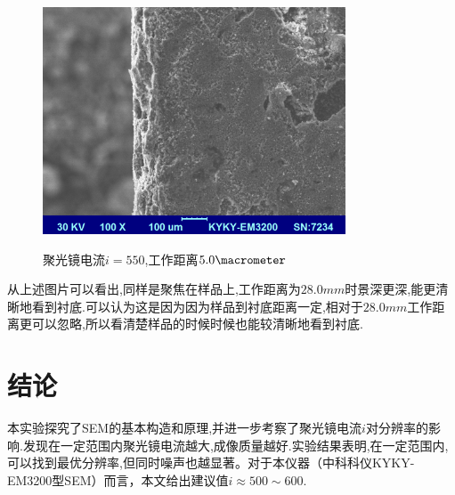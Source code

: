\documentclass[a4paper]{article}
\begin{document}
\begin{figure}[H]
 \centering
 \caption{聚光镜电流$i=550$,工作距离$5.0\si{\macrometer}$}
 \includegraphics[height=6.75cm, width=9cm]{pictures/WorkingDistance/5.bmp}
 \label{result:fig14}
\end{figure}
从上述图片可以看出,同样是聚焦在样品上,工作距离为$28.0\si{mm}$时景深更深,能更清晰地看到衬底.可以认为这是因为因为样品到衬底距离一定,相对于$28.0\si{mm}$工作距离更可以忽略,所以看清楚样品的时候时候也能较清晰地看到衬底.
\section{结论}\label{conclusions}
本实验探究了SEM的基本构造和原理,并进一步考察了聚光镜电流$i$对分辨率的影响.发现在一定范围内聚光镜电流越大,成像质量越好.实验结果表明,在一定范围内,可以找到最优分辨率,但同时噪声也越显著。对于本仪器（中科科仪KYKY-EM3200型SEM）而言，本文给出建议值$i \approx 500\sim 600$. 

\end{document}
